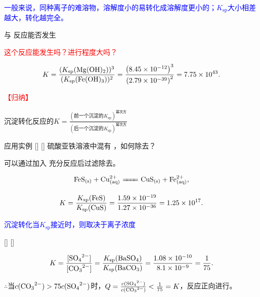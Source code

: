             \textcolor{blue}{一般来说，同种离子的难溶物，溶解度小的易转化成溶解度更小的；\(K_\text{sp}\)大小相差越大，转化越完全。}

            \begin{xmp}{ 与  反应能否发生}

                \textcolor{red}{这个反应能发生吗？进行程度大吗？}

                \[
                    K = \frac{(K_\text{sp}(\cemh{Mg(OH)2}))^3}{(K_\text{sp}(\cemh{Fe(OH)3}))^2} = \frac{\left(\num{8.45E-12}\right)^3}{\left(\num{2.79E-39}\right)^2} = \num{7.75E43}
                .\]
            \end{xmp}

            \textcolor{red}{【归纳】}

            沉淀转化反应的\(K = \frac{\left(\text{前一个沉淀的}K_\text{sp}\right)^\text{幂次方}}{\left(\text{后一个沉淀的}K_\text{sp}\right)^\text{幂次方}}\)
            

            \begin{xmp}
                [硫酸亚铁混有亚铜离子]
                {应用实例}
                []
                []
                硫酸亚铁溶液中混有 ，如何除去？

                可以通过加入  充分反应后过滤除去。

                \[
                    \cemh{FeS_{(s)} + Cu^{2+}_{(aq)} \xleq{} CuS_{(s)} + Fe^{2+}_{(aq)}}
                ,\]

                \[
                    K = \frac{K_\text{sp}(\cemh{FeS})}{K_\text{sp}(\cemh{CuS})} = \frac{\num{1.59E-19}}{\num{1.27E-36}} = \num{1.25E17}
                .\]
            \end{xmp}

            \textcolor{blue}{沉淀转化当\(K_\text{sp}\)接近时，则取决于离子浓度}

            \begin{xmp}
                {}
                []
                []

                \[
                    K = \frac{\cemh{[SO4^{2-}]}}{\cemh{[CO3^{2-}]}} = \frac{K_\text{sp}(\cemh{BaSO4})}{K_\text{sp}(\cemh{BaCO3})} = \frac{\num{1.08E-10}}{\num{8.1E-9}} = \frac{1}{75}
                .\]

                \(\therefore\)当\(c(\cemh{CO_3^{2-}}) > 75c(\cemh{SO_4^{2-}})\)时，\(Q = \frac{c(\cemh{SO_4^{2-}})}{c(\cemh{CO_3^{2-}})} < \frac{1}{75} = K\)，反应正向进行。
            \end{xmp}

